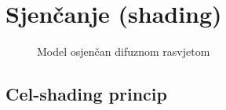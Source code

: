 \section{Sjenčanje (shading)}

\begin{figure}[H]
\caption{Model osjenčan difuznom rasvjetom}
\label{fig:monkey-plastic}
\begin{center}
\end{center}
\end{figure}

\subsection{Cel-shading princip}

